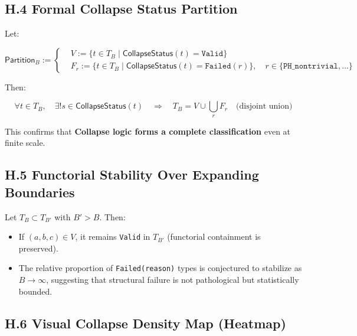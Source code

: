 \documentclass[11pt]{article}
\begin{document}
\subsection*{H.4 Formal Collapse Status Partition}

Let:

\[
\mathsf{Partition}_B := \left\{
\begin{aligned}
& V := \{ t \in T_B \mid \mathsf{CollapseStatus}(t) = \texttt{Valid} \} \\
& F_r := \{ t \in T_B \mid \mathsf{CollapseStatus}(t) = \texttt{Failed}(r) \},\quad r \in \{\texttt{PH\_nontrivial}, \ldots \}
\end{aligned}
\right.
\]

Then:

\[
\forall t \in T_B,\quad \exists! s \in \mathsf{CollapseStatus}(t)
\quad\Rightarrow\quad T_B = V \cup \bigcup_r F_r \quad\text{(disjoint union)}
\]

This confirms that \textbf{Collapse logic forms a complete classification} even at finite scale.

\subsection*{H.5 Functorial Stability Over Expanding Boundaries}

Let \( T_B \subset T_{B'} \) with \( B' > B \). Then:

\begin{itemize}
  \item If \( (a,b,c) \in V \), it remains \texttt{Valid} in \( T_{B'} \) (functorial containment is preserved).
  \item The relative proportion of \texttt{Failed(reason)} types is conjectured to stabilize as \( B \to \infty \),  
  suggesting that structural failure is not pathological but statistically bounded.
\end{itemize}

\subsection*{H.6 Visual Collapse Density Map (Heatmap)}

\begin{center}
\end{center}
\end{document}
